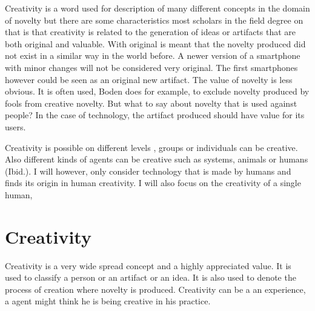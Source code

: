 \documentclass[a4paper]{Thesis}
\begin{document}
Creativity is a word used for description of many different concepts in the domain of novelty but there are some characteristics most scholars in the field degree on that is that creativity is related to the generation of ideas or artifacts that are both original and valuable. With original is meant that the novelty produced did not exist in a similar way in the world before. A newer version of a smartphone with minor changes will not be considered very original. The first smartphones however could be seen as an original new artifact. 
The value of novelty is less obvious. It is often used, Boden does for example, to exclude novelty produced by fools from creative novelty. But what to say about novelty that is used against people? In the case of technology, the artifact produced should have value for its users.


Creativity is possible on different levels \cite{Ferguson2010}, groups or individuals can be creative. Also different kinds of agents can be creative such as systems, animals or humans (Ibid.). I will however, only consider technology that is made by humans and finds its origin  in human creativity. I will also focus on the creativity of a single human,

\section{Creativity}
Creativity is a very wide spread concept and a highly appreciated value. It is used to classify a person or an artifact or an idea.  It is also used to denote the process of creation where novelty is produced. Creativity can be a an experience, a agent might think he is being creative in his practice.

\end{document}
